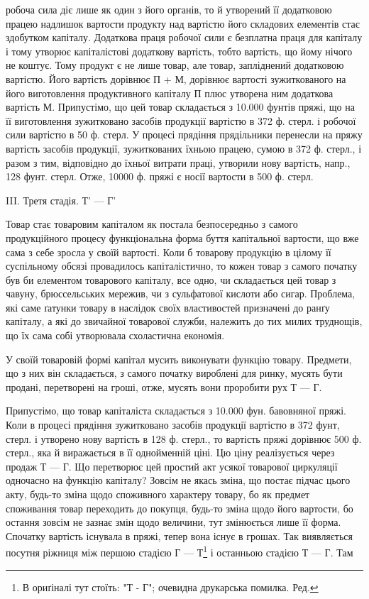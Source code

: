 \parcont{}  %
робоча сила діє лише як один з його органів, то й утворений її додатковою
працею надлишок вартости продукту над вартістю його складових
елементів стає здобутком капіталу. Додаткова праця робочої сили є
безплатна праця для капіталу і тому утворює капіталістові додаткову
вартість, тобто вартість, що йому нічого не коштує. Тому продукт є не
лише товар, але товар, запліднений додатковою вартістю. Його вартість
дорівнює П + М, дорівнює вартості зужиткованого на його виготовлення
продуктивного капіталу П плюс утворена ним додаткова вартість М.
Припустімо, що цей товар складається з 10.000 фунтів пряжі, що на її
виготовлення зужитковано засобів продукції вартістю в 372 ф. стерл. і
робочої сили вартістю в 50 ф. стерл. У процесі прядіння прядільники
перенесли на пряжу вартість засобів продукції, зужиткованих їхньою
працею, сумою в 372 ф. стерл., і разом з тим, відповідно до їхньої
витрати праці, утворили нову вартість, напр., 128 фунт. стерл. Отже,
10000 ф. пряжі є носії вартости в 500 ф. стерл.

III. Третя стадія. Т' — Г'

Товар стає товаровим капіталом як постала безпосередньо з самого
продукційного процесу функціональна форма буття капітальної вартости,
що вже сама з себе зросла у своїй вартості. Коли б товарову продукцію
в цілому її суспільному обсязі провадилось капіталістично, то кожен
товар з самого початку був би елементом товарового капіталу, все одно,
чи складається цей товар з чавуну, брюссельських мережив, чи з сульфатової
кислоти або сигар. Проблема, які саме ґатунки товару в наслідок своїх
властивостей призначені до ранґу капіталу, а які до звичайної товарової
служби, належить до тих милих труднощів, що їх сама собі утворювала
схоластична економія.

У своїй товаровій формі капітал мусить виконувати функцію товару.
Предмети, що з них він складається, з самого початку вироблені для
ринку, мусять бути продані, перетворені на гроші, отже, мусять вони
проробити рух Т — Г.

Припустімо, що товар капіталіста складається з 10.000 фун. бавовняної
пряжі. Коли в процесі прядіння зужитковано засобів продукції вартістю
в 372 фунт, стерл. і утворено нову вартість в 128 ф. стерл., то вартість
пряжі дорівнює 500 ф. стерл., яка й виражається в її однойменній ціні.
Цю ціну реалізується через продаж Т — Г. Що перетворює цей простий
акт усякої товарової циркуляції одночасно на функцію капіталу? Зовсім
не якась зміна, що постає підчас цього акту, будь-то зміна щодо споживного
характеру товару, бо як предмет споживання товар переходить до покупця,
будь-то зміна щодо його вартости, бо остання зовсім не зазнає змін
щодо величини, тут змінюється лише її форма. Спочатку вартість існувала
в пряжі, тепер вона існує в грошах. Так виявляється посутня
ріжниця між першою стадією Г — Т\footnote*{
В ориґіналі тут стоїть: "Т - Г"; очевидна друкарська помилка. Ред.
} і останньою стадією Т — Г. Там
\parbreak{}  %
